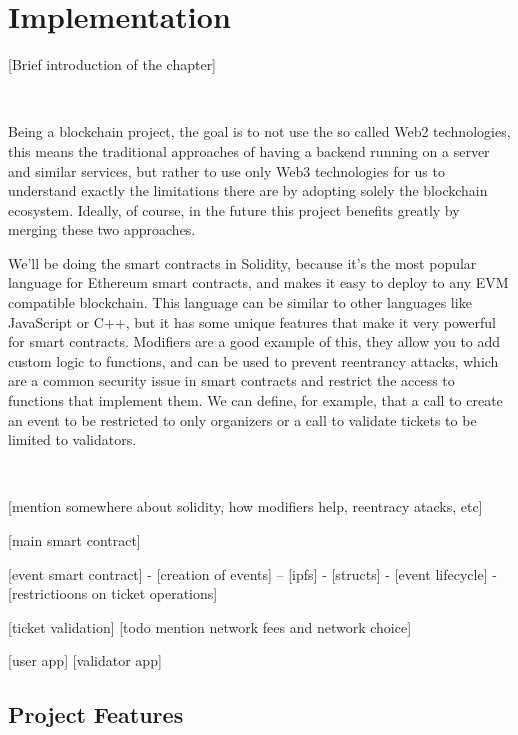 \chapter{Implementation}
 [Brief introduction of the chapter]

~

Being a blockchain project, the goal is to not use the so called Web2 technologies, this means the traditional approaches of having a backend running on a server and similar services, but rather to use only Web3 technologies for us to understand exactly the limitations there are by adopting solely the blockchain ecosystem. Ideally, of course, in the future this project benefits greatly by merging these two approaches.

We'll be doing the smart contracts in Solidity, because it's the most popular language for Ethereum smart contracts, and makes it easy to deploy to any EVM compatible blockchain. This language can be similar to other languages like JavaScript or C++, but it has some unique features that make it very powerful for smart contracts. Modifiers are a good example of this, they allow you to add custom logic to functions, and can be used to prevent reentrancy attacks, which are a common security issue in smart contracts and restrict the access to functions that implement them. We can define, for example, that a call to create an event to be restricted to only organizers or a call to validate tickets to be limited to validators.

~

[mention somewhere about solidity, how modifiers help, reentracy atacks, etc]

[main smart contract]

[event smart contract]
- [creation of events]
-- [ipfs]
- [structs]
- [event lifecycle]
- [restrictioons on ticket operations]

[ticket validation]
[todo mention network fees and network choice]

[user app]
[validator app]

\section{Project Features}
